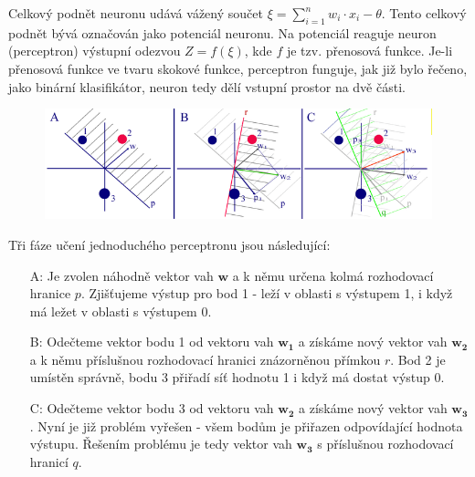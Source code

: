 \documentclass[12pt, a4paper,
twoside,        %
openright
]{report}
\begin{document}
Celkový podnět neuronu udává vážený součet \(\xi = \sum_{i=1}^{n} w_i \cdot x_i - \theta\). Tento celkový podnět bývá označován jako potenciál neuronu. Na potenciál reaguje neuron (perceptron) výstupní odezvou \(Z = f(\xi)\), kde \(f\) je tzv. přenosová funkce. Je-li přenosová funkce ve tvaru skokové funkce, perceptron funguje, jak již bylo řečeno, jako binární klasifikátor, neuron tedy dělí vstupní prostor na dvě části.
\begin{figure}[h]
	\centering
	\includegraphics[width=0.8\linewidth, height=0.8\linewidth, keepaspectratio]{image/tri.png}
	
\end{figure}
Tři fáze učení jednoduchého perceptronu jsou následující:

\begin{enumerate}
	\item[A:] Je zvolen náhodně vektor vah \(\mathbf{w}\) a k němu určena kolmá rozhodovací hranice \(p\). Zjišťujeme výstup pro bod 1 - leží v oblasti s výstupem 1, i když má ležet v oblasti s výstupem 0. 
	\item[B:] Odečteme vektor bodu 1 od vektoru vah \(\mathbf{w_1}\) a získáme nový vektor vah \(\mathbf{w_2}\) a k němu příslušnou rozhodovací hranici znázorněnou přímkou \(r\). Bod 2 je umístěn správně, bodu 3 přiřadí síť hodnotu 1 i když má dostat výstup 0.
	\item[C:] Odečteme vektor bodu 3 od vektoru vah \(\mathbf{w_2}\) a získáme nový vektor vah \(\mathbf{w_3}\). Nyní je již problém vyřešen - všem bodům je přiřazen odpovídající hodnota výstupu. Řešením problému je tedy vektor vah \(\mathbf{w_3}\) s příslušnou rozhodovací hranicí \(q\).
\end{enumerate}
\end{document}
